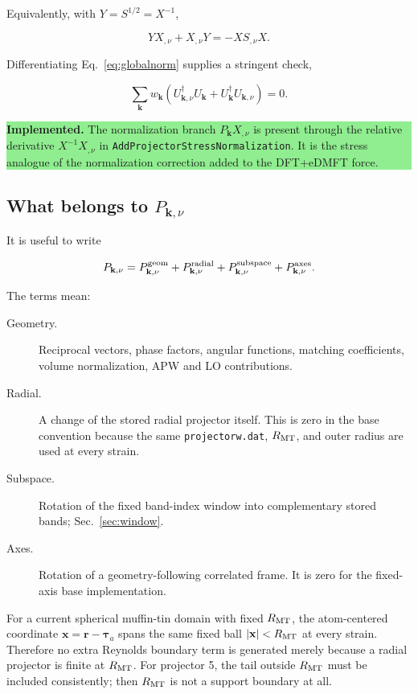 \documentclass[11pt]{article}
\numberwithin{equation}{section}
\newcommand{\kb}{\mathbf k}
\newcommand{\code}[1]{\texttt{#1}}
\newcommand{\status}[2]{\par\medskip\noindent\colorbox{#1}{\parbox{0.965\linewidth}{#2}}\par\medskip}
\newcommand{\implemented}[1]{\status{lightgreen}{\textbf{Implemented.} #1}}
\begin{document}
Equivalently, with $Y=S^{1/2}=X^{-1}$,

\begin{equation}
 YX_{,\nu}+X_{,\nu}Y=-XS_{,\nu}X.
 \label{eq:sylvester}
\end{equation}

Differentiating Eq.~\eqref{eq:globalnorm} supplies a stringent check,

\begin{equation}
 \sum_{\kb}w_{\kb}
 \left(U_{\kb,\nu}^\dagger U_{\kb}
 +U_{\kb}^\dagger U_{\kb,\nu}\right)=0.
 \label{eq:normcheck}
\end{equation}

\implemented{The normalization branch $P_{\kb}X_{,\nu}$ is present through
the relative derivative $X^{-1}X_{,\nu}$ in
\code{AddProjectorStressNormalization}.  It is the stress analogue of the
normalization correction added to the DFT+eDMFT force.}

\subsection{What belongs to $P_{\kb,\nu}$}

It is useful to write

\begin{equation}
 P_{\kb,\nu}=P_{\kb,\nu}^{\rm geom}
 +P_{\kb,\nu}^{\rm radial}
 +P_{\kb,\nu}^{\rm subspace}
 +P_{\kb,\nu}^{\rm axes}.
 \label{eq:Psplit}
\end{equation}

The terms mean:

\begin{description}
\item[Geometry.] Reciprocal vectors, phase factors, angular functions,
matching coefficients, volume normalization, APW and LO contributions.
\item[Radial.] A change of the stored radial projector itself.  This is zero
in the base convention because the same \code{projectorw.dat}, $R_{\rm MT}$,
and outer radius are used at every strain.
\item[Subspace.] Rotation of the fixed band-index window into complementary
stored bands; Sec.~\ref{sec:window}.
\item[Axes.] Rotation of a geometry-following correlated frame.  It is zero
for the fixed-axis base implementation.
\end{description}

For a current spherical muffin-tin domain with fixed $R_{\rm MT}$, the
atom-centered coordinate $\mathbf x=\mathbf r-\boldsymbol\tau_a$ spans the same
fixed ball $|\mathbf x|<R_{\rm MT}$ at every strain.  Therefore no extra
Reynolds boundary term is generated merely because a radial projector is
finite at $R_{\rm MT}$.  For projector 5, the tail outside $R_{\rm MT}$ must be
included consistently; then $R_{\rm MT}$ is not a support boundary at all.
\end{document}
